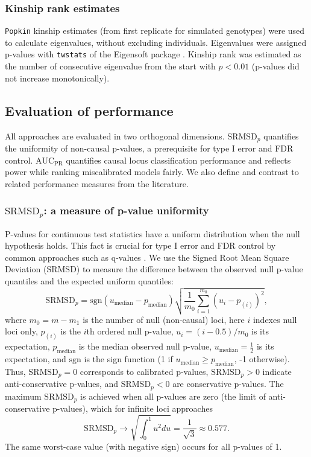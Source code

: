 \documentclass[11pt]{article}
\newcommand{\rmsd}{\text{SRMSD}_p}
\newcommand{\auc}{\text{AUC}_\text{PR}}
\begin{document}
\subsubsection{Kinship rank estimates}

\texttt{Popkin} kinship estimates (from first replicate for simulated genotypes) were used to calculate eigenvalues, without excluding individuals.
Eigenvalues were assigned p-values with \texttt{twstats} of the Eigensoft package \citep{patterson_population_2006}.
Kinship rank was estimated as the number of consecutive eigenvalue from the start with $p < 0.01$ (p-values did not increase monotonically).

\subsection{Evaluation of performance}

All approaches are evaluated in two orthogonal dimensions.
$\rmsd$ quantifies the uniformity of non-causal p-values, a prerequisite for type I error and FDR control.
$\auc$ quantifies causal locus classification performance and reflects power while ranking miscalibrated models fairly.
We also define and contrast to related performance measures from the literature.

\subsubsection{$\rmsd$: a measure of p-value uniformity}

P-values for continuous test statistics have a uniform distribution when the null hypothesis holds.
This fact is crucial for type I error and FDR control by common approaches such as q-values \citep{storey_positive_2003, storey_statistical_2003}.
We use the Signed Root Mean Square Deviation (SRMSD) to measure the difference between the observed null p-value quantiles and the expected uniform quantiles:
$$
\rmsd
=
\text{sgn}(u_\text{median} - p_\text{median} ) \sqrt{ \frac{1}{m_0} \sum_{i = 1}^{m_0} \left( u_i - p_{(i)} \right)^2 },
$$
where
$m_0 = m - m_1$ is the number of null (non-causal) loci,
here $i$ indexes null loci only,
$p_{(i)}$ is the $i$th ordered null p-value,
$u_i = ( i - 0.5 ) / m_0$ is its expectation,
$p_\text{median}$ is the median observed null p-value,
$u_\text{median} = \frac{1}{2}$ is its expectation,
and $\text{sgn}$ is the sign function (1 if $u_\text{median} \ge p_\text{median}$, -1 otherwise).
Thus, $\rmsd = 0$ corresponds to calibrated p-values, $\rmsd > 0$ indicate anti-conservative p-values, and $\rmsd < 0$ are conservative p-values.
The maximum $\rmsd$ is achieved when all p-values are zero (the limit of anti-conservative p-values), which for infinite loci approaches
$$
\rmsd
\rightarrow
\sqrt{ \int_0^1 u^2 du }
=
\frac{1}{ \sqrt{ 3 } }
\approx
0.577
.
$$
The same worst-case value (with negative sign) occurs for all p-values of 1.
\end{document}

